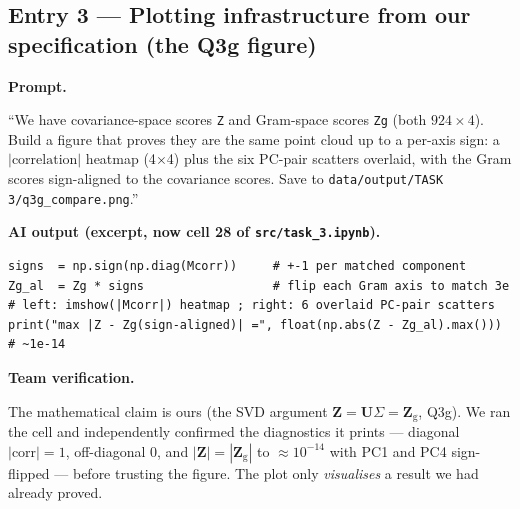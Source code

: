 \documentclass[11pt,a4paper]{article}
\newcommand{\logentry}[1]{\subsection*{#1}}
\begin{document}
\logentry{Entry 3 --- Plotting infrastructure from our specification (the Q3g figure)}
\textbf{Prompt.}
\begin{promptbox}
``We have covariance-space scores \texttt{Z} and Gram-space scores \texttt{Zg} (both $924\times4$).
Build a figure that proves they are the same point cloud up to a per-axis sign: a
$|\text{correlation}|$ heatmap (4$\times$4) plus the six PC-pair scatters overlaid, with the Gram
scores sign-aligned to the covariance scores. Save to \texttt{data/output/TASK 3/q3g\_compare.png}.''
\end{promptbox}
\textbf{AI output (excerpt, now cell 28 of \texttt{src/task\_3.ipynb}).}
\begin{outbox}
\begin{lstlisting}
signs  = np.sign(np.diag(Mcorr))     # +-1 per matched component
Zg_al  = Zg * signs                  # flip each Gram axis to match 3e
# left: imshow(|Mcorr|) heatmap ; right: 6 overlaid PC-pair scatters
print("max |Z - Zg(sign-aligned)| =", float(np.abs(Z - Zg_al).max()))  # ~1e-14
\end{lstlisting}
\end{outbox}
\textbf{Team verification.}
\begin{verbox}
The mathematical claim is ours (the SVD argument $\mathbf Z=\mathbf U\Sigma=\mathbf Z_{\mathrm g}$,
Q3g). We ran the cell and independently confirmed the diagnostics it prints --- diagonal
$|\text{corr}|=1$, off-diagonal $0$, and $|\mathbf Z|=|\mathbf Z_{\mathrm g}|$ to $\approx10^{-14}$
with PC1 and PC4 sign-flipped --- before trusting the figure. The plot only \emph{visualises} a
result we had already proved.
\end{verbox}
\end{document}
